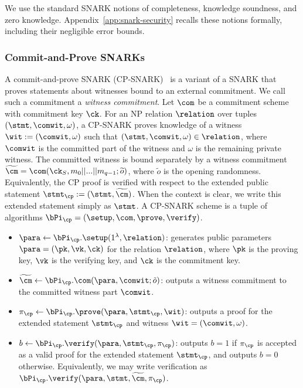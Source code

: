 \begin{remark}
We use the standard SNARK notions of completeness, knowledge soundness, and
zero knowledge.  Appendix~\ref{app:snark-security} recalls these notions
formally, including their negligible error bounds. 
\end{remark}


\subsubsection{Commit-and-Prove SNARKs}
A commit-and-prove SNARK (CP-SNARK)~\cite{gnark, legosnark} is a variant of a SNARK that proves statements about witnesses bound to an external commitment. We call such a commitment a \emph{witness commitment}. Let $\com$ be a commitment scheme with commitment key $\ck$. For an NP relation $\relation$ over tuples $(\stmt,\comwit,\omega)$, a CP-SNARK proves knowledge of a witness
$\wit := (\comwit,\omega)$ such that $(\stmt,\comwit,\omega)\in\relation$,
where $\comwit$ is the committed part of the witness and $\omega$ is the
remaining private witness.  The committed witness is bound separately by a
witness commitment
$\widetilde{\cm} = \com(\ck_S, m_0 || ... || m_{q-1}; \widetilde{o})$, where $\tilde{o}$ is the
opening randomness.  Equivalently, the CP proof is verified with respect to the
extended public statement $\stmt_{\cp}:=(\stmt,\widetilde{\cm})$.  When the
context is clear, we write this extended statement simply as $\stmt$.
A CP-SNARK scheme is a tuple of algorithms
$\bPi_{\cp}=(\setup,\com,\prove,\verify)$.

\begin{itemize}
    \item $\para \gets \bPi_{\cp}.\setup(1^\lambda,\relation)$: generates public parameters $\para=(\pk,\vk,\ck)$ for the relation $\relation$, where $\pk$ is the proving key, $\vk$ is the verifying key, and $\ck$ is the commitment key.

    \item $\widetilde{\cm} \gets \bPi_{\cp}.\com(\para,\comwit;\tilde{o})$:
    outputs a witness commitment to the committed witness part $\comwit$.

    \item $\pi_{\cp} \gets \bPi_{\cp}.\prove(\para,\stmt_{\cp},\wit)$:
    outputs a proof for the extended statement $\stmt_{\cp}$ and witness
    $\wit=(\comwit,\omega)$.

    \item $b \gets \bPi_{\cp}.\verify(\para,\stmt_{\cp},\pi_{\cp})$:
    outputs $b=1$ if $\pi_{\cp}$ is accepted as a valid proof for the extended
    statement $\stmt_{\cp}$, and outputs $b=0$ otherwise. Equivalently, we may
    write verification as
    $\bPi_{\cp}.\verify(\para,\stmt,\widetilde{\cm},\pi_{\cp})$.
\end{itemize}




